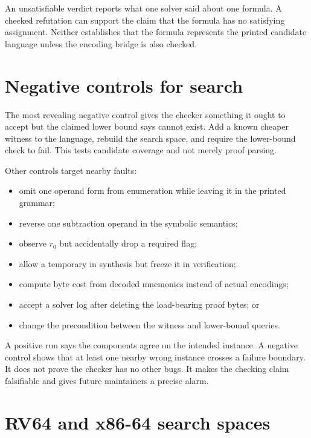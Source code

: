 \begin{warning}[title={A solver verdict is not a portable lower bound}]
An unsatisfiable verdict reports what one solver said about one formula. A
checked refutation can support the claim that the formula has no satisfying
assignment. Neither establishes
that the formula represents the printed candidate language unless the
encoding bridge is also checked.
\end{warning}

\section{Negative controls for search}

The most revealing negative control gives the checker something it ought to
accept but the claimed lower bound says cannot exist. Add a known cheaper
witness to the language, rebuild the search space, and require the
lower-bound check to fail. This tests candidate coverage and not merely proof
parsing.

Other controls target nearby faults:

\begin{itemize}
\item omit one operand form from enumeration while leaving it in the printed
grammar;
\item reverse one subtraction operand in the symbolic semantics;
\item observe \(r_0\) but accidentally drop a required flag;
\item allow a temporary in synthesis but freeze it in verification;
\item compute byte cost from decoded mnemonics instead of actual encodings;
\item accept a solver log after deleting the load-bearing proof bytes; or
\item change the precondition between the witness and lower-bound queries.
\end{itemize}

A positive run says the components agree on the intended instance. A
negative control shows that at least one nearby wrong instance crosses a
failure boundary. It does not prove the checker has no other bugs. It makes
the checking claim falsifiable and gives future maintainers a precise alarm.

\section{RV64 and x86-64 search spaces}

